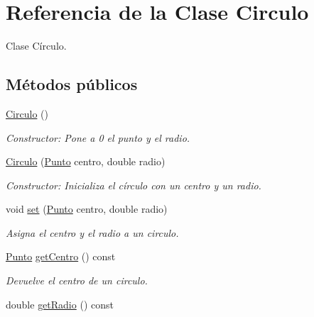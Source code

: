 \hypertarget{classCirculo}{}\section{Referencia de la Clase Circulo}
\label{classCirculo}


Clase Círculo.  


\subsection*{Métodos públicos}
\begin{DoxyCompactItemize}
\item 
\hyperlink{classCirculo_a6933bf908b78a4167684081a3a8f257f}{Circulo} ()\hypertarget{classCirculo_a6933bf908b78a4167684081a3a8f257f}{}\label{classCirculo_a6933bf908b78a4167684081a3a8f257f}

\begin{DoxyCompactList}\small\item\em Constructor\+: Pone a 0 el punto y el radio. \end{DoxyCompactList}\item 
\hyperlink{classCirculo_ad4c6c76f0227c25afcb872a8744ebe56}{Circulo} (\hyperlink{classPunto}{Punto} centro, double radio)\hypertarget{classCirculo_ad4c6c76f0227c25afcb872a8744ebe56}{}\label{classCirculo_ad4c6c76f0227c25afcb872a8744ebe56}

\begin{DoxyCompactList}\small\item\em Constructor\+: Inicializa el círculo con un centro y un radio. \end{DoxyCompactList}\item 
void \hyperlink{classCirculo_aa24cc4b316a3d9ece35f120d9b8e1fc4}{set} (\hyperlink{classPunto}{Punto} centro, double radio)\hypertarget{classCirculo_aa24cc4b316a3d9ece35f120d9b8e1fc4}{}\label{classCirculo_aa24cc4b316a3d9ece35f120d9b8e1fc4}

\begin{DoxyCompactList}\small\item\em Asigna el centro y el radio a un circulo. \end{DoxyCompactList}\item 
\hyperlink{classPunto}{Punto} \hyperlink{classCirculo_a022cde4d10d14a47a3b3921f80909f3b}{get\+Centro} () const \hypertarget{classCirculo_a022cde4d10d14a47a3b3921f80909f3b}{}\label{classCirculo_a022cde4d10d14a47a3b3921f80909f3b}

\begin{DoxyCompactList}\small\item\em Devuelve el centro de un circulo. \end{DoxyCompactList}\item 
double \hyperlink{classCirculo_a982f8a785d8a68ab1483b609cd752980}{get\+Radio} () const \hypertarget{classCirculo_a982f8a785d8a68ab1483b609cd752980}{}\label{classCirculo_a982f8a785d8a68ab1483b609cd752980}


\end{DoxyCompactItemize}
